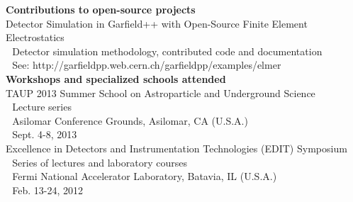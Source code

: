 {\noindent\textbf{Contributions to open-source projects}}\\

\indent\hspace{0.2 cm}Detector Simulation in Garfield++ with Open-Source Finite Element Electrostatics\\
\indent\hspace{0.2 cm}\hspace{0.6 cm}\textbullet\,\, Detector simulation methodology, contributed code and documentation\\
\indent\hspace{0.2 cm}\hspace{0.6 cm}\textbullet\,\, See: http://garfieldpp.web.cern.ch/garfieldpp/examples/elmer\\

{\noindent\textbf{Workshops and specialized schools attended}}\\

\indent\hspace{0.2 cm}TAUP 2013 Summer School on Astroparticle and Underground Science\\
\indent\hspace{0.2 cm}\hspace{0.6 cm}\textbullet\,\, Lecture series\\
\indent\hspace{0.2 cm}\hspace{0.6 cm}\textbullet\,\, Asilomar Conference Grounds, Asilomar, CA (U.S.A.)\\
\indent\hspace{0.2 cm}\hspace{0.6 cm}\textbullet\,\, Sept. 4-8, 2013\\

\indent\hspace{0.2 cm}Excellence in Detectors and Instrumentation Technologies (EDIT) Symposium\\
\indent\hspace{0.2 cm}\hspace{0.6 cm}\textbullet\,\, Series of lectures and laboratory courses\\
\indent\hspace{0.2 cm}\hspace{0.6 cm}\textbullet\,\, Fermi National Accelerator Laboratory, Batavia, IL (U.S.A.)\\
\indent\hspace{0.2 cm}\hspace{0.6 cm}\textbullet\,\, Feb. 13-24, 2012\\


